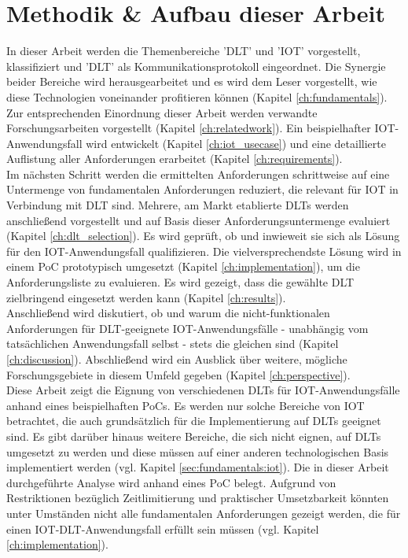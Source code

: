 \section{Methodik \& Aufbau dieser Arbeit}
\label{sec:intro:methodology}
In dieser Arbeit werden die Themenbereiche '\ac{DLT}' und '\ac{IOT}' vorgestellt, klassifiziert und '\ac{DLT}' als Kommunikationsprotokoll eingeordnet. Die Synergie beider Bereiche wird herausgearbeitet und es wird dem Leser vorgestellt, wie diese Technologien voneinander profitieren können (Kapitel \ref{ch:fundamentals}).\\
Zur entsprechenden Einordnung dieser Arbeit werden verwandte Forschungsarbeiten vorgestellt (Kapitel \ref{ch:relatedwork}). Ein beispielhafter \ac{IOT}-Anwendungsfall wird entwickelt (Kapitel \ref{ch:iot_usecase}) und eine detaillierte Auflistung aller Anforderungen erarbeitet (Kapitel \ref{ch:requirements}).\\
Im nächsten Schritt werden die ermittelten Anforderungen schrittweise auf eine Untermenge von fundamentalen Anforderungen reduziert, die relevant für \ac{IOT} in Verbindung mit \ac{DLT} sind. Mehrere, am Markt etablierte \acp{DLT} werden anschließend vorgestellt und auf Basis dieser Anforderungsuntermenge evaluiert (Kapitel \ref{ch:dlt_selection}). Es wird geprüft, ob und inwieweit sie sich als Lösung für den \ac{IOT}-Anwendungsfall qualifizieren. Die vielversprechendste Lösung wird in einem \ac{PoC} prototypisch umgesetzt (Kapitel \ref{ch:implementation}), um die Anforderungsliste zu evaluieren. Es wird gezeigt, dass die gewählte \ac{DLT} zielbringend eingesetzt werden kann (Kapitel \ref{ch:results}).\\
Anschließend wird diskutiert, ob und warum die nicht-funktionalen Anforderungen für \ac{DLT}-geeignete \ac{IOT}-Anwendungsfälle - unabhängig vom tatsächlichen Anwendungsfall selbst - stets die gleichen sind (Kapitel \ref{ch:discussion}). Abschließend wird ein Ausblick über weitere, mögliche Forschungsgebiete in diesem Umfeld gegeben (Kapitel \ref{ch:perspective}).\\

Diese Arbeit zeigt die Eignung von verschiedenen \acp{DLT} für \ac{IOT}-Anwendungsfälle anhand eines beispielhaften \acp{PoC}. Es werden nur solche Bereiche von \ac{IOT} betrachtet, die auch grundsätzlich für die Implementierung auf \acp{DLT} geeignet sind. Es gibt darüber hinaus weitere Bereiche, die sich nicht eignen, auf \acp{DLT} umgesetzt zu werden und diese müssen auf einer anderen technologischen Basis implementiert werden (vgl. Kapitel \ref{sec:fundamentals:iot}). Die in dieser Arbeit durchgeführte Analyse wird anhand eines \ac{PoC} belegt. Aufgrund von Restriktionen bezüglich Zeitlimitierung und praktischer Umsetzbarkeit könnten unter Umständen nicht alle fundamentalen Anforderungen gezeigt werden, die für einen \ac{IOT}-\ac{DLT}-Anwendungsfall erfüllt sein müssen (vgl. Kapitel \ref{ch:implementation}).
